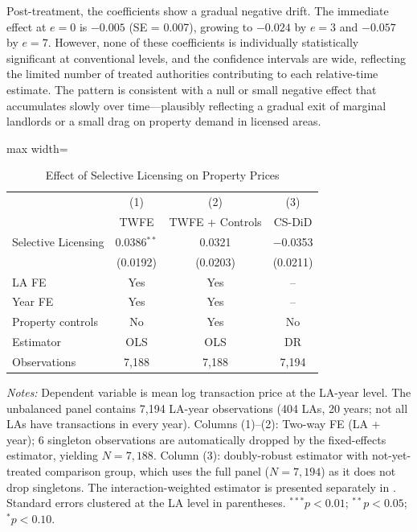 \documentclass[12pt]{article}
\begin{document}
Post-treatment, the coefficients show a gradual negative drift. The immediate effect at $e = 0$ is $-0.005$ (SE = 0.007), growing to $-0.024$ by $e = 3$ and $-0.057$ by $e = 7$. However, none of these coefficients is individually statistically significant at conventional levels, and the confidence intervals are wide, reflecting the limited number of treated authorities contributing to each relative-time estimate. The pattern is consistent with a null or small negative effect that accumulates slowly over time---plausibly reflecting a gradual exit of marginal landlords or a small drag on property demand in licensed areas.

\begin{table}[t]
\centering
\caption{Effect of Selective Licensing on Property Prices}
\label{tab:main}
\begin{adjustbox}{max width=\textwidth}
\begin{tabular}{lccc}
\toprule
 & (1) & (2) & (3) \\
 & TWFE & TWFE + Controls & CS-DiD \\
\midrule
Selective Licensing & 0.0386$^{**}$ & 0.0321 & $-$0.0353 \\
 & (0.0192) & (0.0203) & (0.0211) \\[6pt]
\midrule
LA FE & Yes & Yes & -- \\
Year FE & Yes & Yes & -- \\
Property controls & No & Yes & No \\
Estimator & OLS & OLS & DR \\
Observations & 7,188 & 7,188 & 7,194 \\
\bottomrule
\end{tabular}
\end{adjustbox}
\begin{tablenotes}[flushleft]
\small
\item \textit{Notes:} Dependent variable is mean log transaction price at the LA-year level. The unbalanced panel contains 7,194 LA-year observations (404 LAs, 20 years; not all LAs have transactions in every year). Columns (1)--(2): Two-way FE (LA + year); 6 singleton observations are automatically dropped by the fixed-effects estimator, yielding $N = 7{,}188$. Column (3): \citet{callaway2021difference} doubly-robust estimator with not-yet-treated comparison group, which uses the full panel ($N = 7{,}194$) as it does not drop singletons. The \citet{sun2021estimating} interaction-weighted estimator is presented separately in . Standard errors clustered at the LA level in parentheses. $^{***}p<0.01$; $^{**}p<0.05$; $^{*}p<0.10$.
\end{tablenotes}
\end{table}
\end{document}
